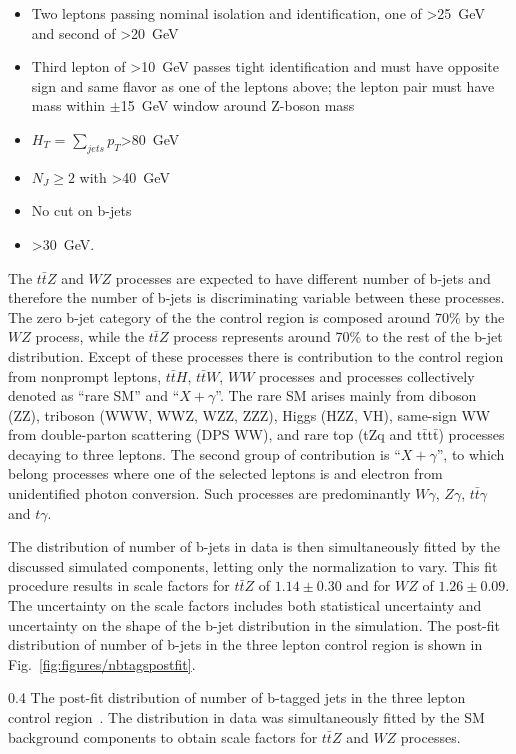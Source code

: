 \begin{itemize}
\item Two leptons passing nominal isolation and identification, one of \pt>25~GeV and second of \pt>20~GeV
\item Third lepton of \pt>10~GeV passes tight identification and must have opposite sign and same flavor as one of the leptons above; the lepton pair must have mass within $\pm$15~GeV window around Z-boson mass
\item $H_{T}$ = $\sum_{jets} p_{T}$>80~GeV
\item $N_{J} \geq 2$ with \pt>40~GeV
\item No cut on b-jets
\item \MET>30~GeV.

\end{itemize}

The $t\bar{t}Z$ and  $WZ$ processes are expected to have different number of b-jets and therefore the number of b-jets is discriminating variable between these processes. The zero b-jet category of the the control region is composed around 70\% by the $WZ$ process, while the $t\bar{t}Z$ process represents around 70\% to the rest of the b-jet distribution. Except of these processes there is contribution to the control region from nonprompt leptons, $t\bar{t}H$,  $t\bar{t}W$, $WW$ processes and processes collectively denoted as ``rare SM'' and ``$X+\gamma$''. The rare SM arises mainly from diboson (ZZ), triboson (WWW, WWZ, WZZ, ZZZ), Higgs (HZZ, VH), same-sign WW from double-parton scattering (DPS WW), and rare top (tZq and $\mathrm{t\bar{t}t\bar{t}}$) processes decaying to three leptons. The second group of contribution is ``$X+\gamma$'', to which belong processes where one of the selected leptons is and electron from unidentified photon conversion. Such processes are predominantly $W\gamma$, $Z\gamma$, $t\bar{t}\gamma$ and $t\gamma$.

The distribution of number of b-jets in data is then simultaneously fitted by the discussed simulated components, letting only the normalization to vary. This fit procedure results in scale factors for $t\bar{t}Z$ of $1.14 \pm 0.30$ and for $WZ$ of $1.26 \pm 0.09$. The uncertainty on the scale factors includes both statistical uncertainty and uncertainty on the shape of the b-jet distribution in the simulation. The post-fit distribution of number of b-jets in the three lepton control region is shown in Fig.~\ref{fig:figures/nbtagspostfit}.

                 {0.4}       %
                 { The post-fit distribution of number of b-tagged jets in the three lepton control region~\cite{Sirunyan:2017uyt}. The distribution in data was simultaneously fitted by the SM background components to obtain scale factors for $t\bar{t}Z$ and $WZ$ processes.  }


